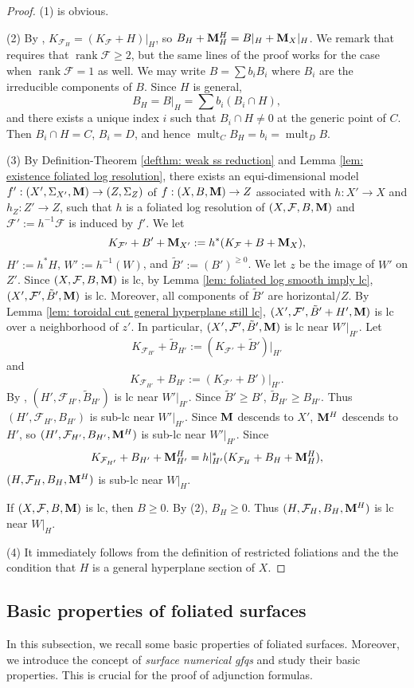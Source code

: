 \documentclass[11pt]{amsart}
\numberwithin{equation}{section}
\newcommand{\Mm}{{\bf{M}}}
\newcommand{\rk}{\operatorname{rank}}
\newcommand{\mult}{\operatorname{mult}}
\newcommand{\Ff}{\mathcal{F}}
\theoremstyle{definition}
\theoremstyle{definition}
\theoremstyle{definition}
\begin{document}
\begin{proof}
(1) is obvious. 

(2) By \cite[Proposition 3.6]{Dru21}, $K_{\Ff_H}=(K_{\Ff}+H)|_H$, so $B_H+\Mm^H_H=B|_H+\Mm_X|_H$.  We remark that \cite[Proposition 3.6]{Dru21} requires that $\rk\Ff\geq 2$, but the same lines of the proof works for the case when $\rk\Ff=1$ as well. We may write $B=\sum b_iB_i$ where $B_i$ are the irreducible components of $B$. Since $H$ is general, 
$$B_H=B|_H=\sum b_i(B_i\cap H),$$ 
and there exists a unique index $i$ such that $B_i\cap H\not=0$ at the generic point of $C$. Then $B_i\cap H=C$, $B_i=D$, and hence $\mult_CB_H=b_i=\mult_DB$.

(3) By Definition-Theorem \ref{defthm: weak ss reduction} and Lemma \ref{lem: existence foliated log resolution}, there exists an equi-dimensional model $f': (X',\Sigma_{X'},\Mm)\rightarrow (Z,\Sigma_Z)$ of $f: (X,B,\Mm)\rightarrow Z$ associated with $h: X'\rightarrow X$ and $h_Z: Z'\rightarrow Z$, such that $h$ is a foliated log resolution of $(X,\Ff,B,\Mm)$ and $\Ff':=h^{-1}\Ff$ is induced by $f'$. We let $$K_{\Ff'}+B'+\Mm_{X'}:=h^*(K_{\Ff}+B+\Mm_X),$$ $H':=h^*H$, $W':=h^{-1}(W)$, and $\tilde B':=(B')^{\geq 0}$. We let $z$ be the image of $W'$ on $Z'$. Since $(X,\Ff,B,\Mm)$ is lc, by Lemma \ref{lem: foliated log smooth imply lc}, $(X',\Ff',\tilde B',\Mm)$ is lc. Moreover, all components of $\tilde B'$ are horizontal$/Z$. By Lemma \ref{lem: toroidal cut general hyperplane still lc}, $(X',\Ff',\tilde B'+H',\Mm)$ is lc over a neighborhood of $z'$. In  particular, $(X',\Ff',\tilde B',\Mm)$ is lc near $W'|_{H'}$. Let
$$K_{\Ff_{H'}}+\tilde B_{H'}:=(K_{\Ff'}+\tilde B')|_{H'}$$
and
$$K_{\Ff_{H'}}+B_{H'}:=(K_{\Ff'}+B')|_{H'}.$$ 
By \cite[Proposition 3.2]{ACSS21}, $(H',\Ff_{H'},\tilde B_{H'})$ is lc near $W'|_{H'}$. Since $\tilde B'\geq B'$, $\tilde B_{H'}\geq B_{H'}$. Thus $(H',\Ff_{H'},B_{H'})$ is sub-lc near $W'|_{H'}$. Since $\Mm$ descends to $X'$, $\Mm^H$ descends to $H'$, so $(H',\Ff_{H'},B_{H'},\Mm^H)$ is sub-lc near $W'|_{H'}$. Since $$K_{\Ff_{H'}}+B_{H'}+\Mm^H_{H'}=h|_{H'}^*(K_{\Ff_H}+B_H+\Mm^H_H),$$ 
$(H,\Ff_H,B_H,\Mm^H)$ is sub-lc near $W|_H$. 

If $(X,\Ff,B,\Mm)$ is lc, then $B\geq 0$. By (2), $B_H\geq 0$. Thus $(H,\Ff_H,B_H,\Mm^H)$ is lc near $W|_H$.

(4) It immediately follows from the definition of restricted foliations and the the condition that $H$ is a general hyperplane section of $X$.
\end{proof}

\subsection{Basic properties of foliated surfaces}
In this subsection, we recall some basic properties of foliated surfaces. Moreover, we introduce the concept of \emph{surface numerical gfqs} and study their basic properties. This is crucial for the proof of adjunction formulas.
\end{document}
